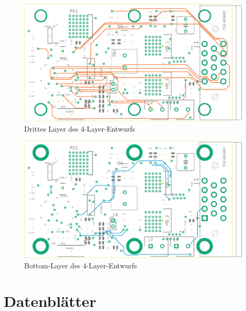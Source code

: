 \begin{figure}[H]%
\centering
\includegraphics[angle=-90,width=0.7\columnwidth]{./Bilder/15route4layer}%
\caption{Drittes Layer des 4-Layer-Entwurfs}%
\label{}%
\end{figure}\newpage
\begin{figure}[H]%
\centering
\includegraphics[angle=-90,width=0.7\columnwidth]{./Bilder/bot4layer}%
\caption{Bottom-Layer des 4-Layer-Entwurfs}%
\label{}%
\end{figure}
\cleardoublepage
\chapter{Datenblätter}
